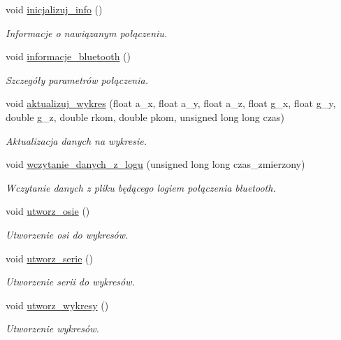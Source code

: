 \begin{DoxyCompactItemize}
void \hyperlink{class_main_window_a7b1012fca99df34abcdc108974ab583c}{inicjalizuj\+\_\+info} ()
\begin{DoxyCompactList}\small\item\em Informacje o nawiązanym połączeniu. \end{DoxyCompactList}\item 
void \hyperlink{class_main_window_ac3bcbf1dc657f039bf90254b24e023a5}{informacje\+\_\+bluetooth} ()
\begin{DoxyCompactList}\small\item\em Szczegóły parametrów połączenia. \end{DoxyCompactList}\item 
void \hyperlink{class_main_window_ad6eb500a681306e95262d1c55dab9594}{aktualizuj\+\_\+wykres} (float a\+\_\+x, float a\+\_\+y, float a\+\_\+z, float g\+\_\+x, float g\+\_\+y, double g\+\_\+z, double rkom, double pkom, unsigned long long czas)
\begin{DoxyCompactList}\small\item\em Aktualizacja danych na wykresie. \end{DoxyCompactList}\item 
void \hyperlink{class_main_window_a5c39c76ab1f6edbff934e87a385bd5bd}{wczytanie\+\_\+danych\+\_\+z\+\_\+logu} (unsigned long long czas\+\_\+zmierzony)
\begin{DoxyCompactList}\small\item\em Wczytanie danych z pliku będącego logiem połączenia bluetooth. \end{DoxyCompactList}\item 
void \hyperlink{class_main_window_a94be5a5d63c0b8f071923a32f0215198}{utworz\+\_\+osie} ()
\begin{DoxyCompactList}\small\item\em Utworzenie osi do wykresów. \end{DoxyCompactList}\item 
void \hyperlink{class_main_window_a7c108455f05b3e2532088b38870e2ca2}{utworz\+\_\+serie} ()
\begin{DoxyCompactList}\small\item\em Utworzenie serii do wykresów. \end{DoxyCompactList}\item 
void \hyperlink{class_main_window_a01486cea6f70518576b42f372c7fbf7a}{utworz\+\_\+wykresy} ()
\begin{DoxyCompactList}\small\item\em Utworzenie wykresów. \end{DoxyCompactList}\item 

\end{DoxyCompactItemize}
